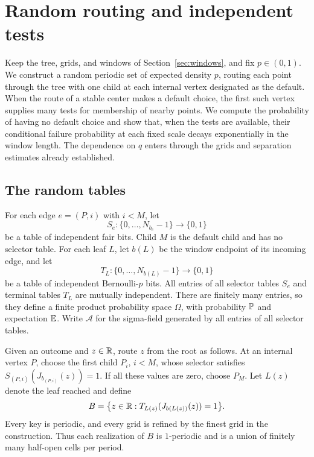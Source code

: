 \section{Random routing and independent tests}
\label{sec:routing}

Keep the tree, grids, and windows of Section~\ref{sec:windows}, and fix
\(p\in(0,1)\). We construct a random periodic set of expected density
\(p\), routing each point through the tree with one child at each internal vertex
designated as the default. When the route of a stable center makes a
default choice, the first such vertex supplies many tests for membership
of nearby points. We compute the probability of having no default choice
and show that, when the tests are available, their conditional failure
probability at each fixed scale decays exponentially in the window length.
The dependence on \(q\) enters through the grids and separation estimates
already established.

\subsection{The random tables}

For each edge \(e=(P,i)\) with \(i<M\), let
\[
 S_e:\{0,\ldots,N_{b_e}-1\}\longrightarrow\{0,1\}
\]
be a table of independent fair bits. Child \(M\) is the default child
and has no selector table. For each leaf \(L\), let \(b(L)\) be the
window endpoint of its incoming edge, and let
\[
 T_L:\{0,\ldots,N_{b(L)}-1\}\longrightarrow\{0,1\}
\]
be a table of independent Bernoulli-\(p\) bits. All entries of all
selector tables \(S_e\) and terminal tables \(T_L\) are mutually
independent. There are finitely many entries, so they define a finite
product probability space \(\Omega\), with probability \(\mathbb P\) and
expectation \(\mathbb E\). Write \(\mathcal A\) for the sigma-field generated
by all entries of all selector tables.

Given an outcome and \(z\in\mathbb R\), route \(z\) from the root as follows.
At an internal vertex \(P\), choose the first child \(P_i\), \(i<M\),
whose selector satisfies
\(S_{(P,i)}(J_{b_{(P,i)}}(z))=1\). If all these values are zero, choose
\(P_M\). Let \(L(z)\) denote the leaf reached and define
\begin{equation}
 \label{eq:random-set}
 B=\bigl\{z\in\mathbb R:
 T_{L(z)}(J_{b(L(z))}(z))=1\bigr\}.
\end{equation}
Every key is periodic, and every grid is refined by the finest grid in
the construction. Thus each realization of \(B\) is \(1\)-periodic
and is a union of finitely many half-open cells per period.

